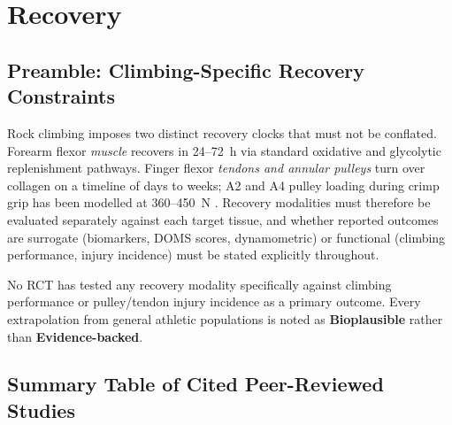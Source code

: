 \section{Recovery}
\label{sec:recovery}

\subsection*{Preamble: Climbing-Specific Recovery Constraints}

Rock climbing imposes two distinct recovery clocks that must not be conflated. Forearm flexor \emph{muscle} recovers in 24--72~h via standard oxidative and glycolytic replenishment pathways. Finger flexor \emph{tendons and annular pulleys} turn over collagen on a timeline of days to weeks; A2 and A4 pulley loading during crimp grip has been modelled at 360--450~N \cite{VQLM06}. Recovery modalities must therefore be evaluated separately against each target tissue, and whether reported outcomes are surrogate (biomarkers, DOMS scores, dynamometric) or functional (climbing performance, injury incidence) must be stated explicitly throughout.

No RCT has tested any recovery modality specifically against climbing performance or pulley/tendon injury incidence as a primary outcome. Every extrapolation from general athletic populations is noted as \textbf{Bioplausible} rather than \textbf{Evidence-backed}.

\subsection*{Summary Table of Cited Peer-Reviewed Studies}

